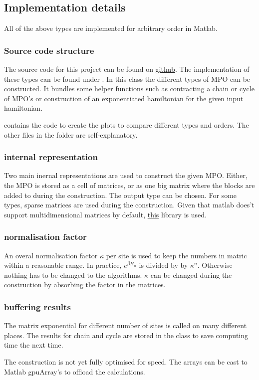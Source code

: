 

\subsection{Implementation details}

All of the above types are implemented for arbitrary order in Matlab.

\subsubsection{Source code structure}

The source code for this project can be found on \href{https://github.com/DavidDevoogdt/Thesis_Tensor_Networks}{github}. The implementation of these types can be found under . In this class the different types of MPO can be constructed. It bundles some helper functions such as contracting a chain or cycle of MPO's or construction of an exponentiated hamiltonian for the given input hamiltonian.

  contains the code to create the plots to compare different types and orders. The other files in the folder are self-explanatory.

\subsubsection{internal representation}

Two main inernal representations are used to construct the given MPO. Either, the MPO is stored as a cell of matrices, or as one big matrix where the blocks are added to during the construction. The output type can be chosen. For some types, sparse matrices are used during the construction. Given that matlab does't support multidimensional matrices by default, \href{https://nl.mathworks.com/matlabcentral/fileexchange/29832-n-dimensional-sparse-arrays}{this} library is used.

\subsubsection{normalisation factor}

An overal normalisation factor $\kappa$ per site is used to keep the numbers in matric within a reasonable range. In practice, $e^{\beta H_n}$ is divided by by $\kappa^n$. Otherwise nothing has to be changed to the algorithms. $\kappa$ can be changed during the construction by absorbing the factor in the matrices.

\subsubsection{buffering results}

The matrix exponential for different number of sites is called on many different places. The results for chain and cycle are stored in the class to save computing time the next time.

The construction is not yet fully optimised for speed. The arrays can be cast to Matlab gpuArray's to offload the calculations.